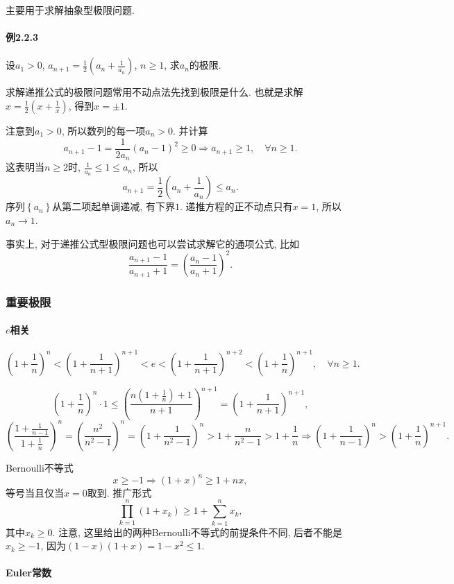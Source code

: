 主要用于求解抽象型极限问题.

\paragraph{例2.2.3}

设$a_{1}>0$, $a_{n+1}=\frac{1}{2}\left(a_{n}+\frac{1}{a_{n}}\right)$,
$n\ge1$, 求$a_{n}$的极限.

求解递推公式的极限问题常用不动点法先找到极限是什么. 也就是求解$x=\frac{1}{2}\left(x+\frac{1}{x}\right)$,
得到$x=\pm1$.

注意到$a_{1}>0$, 所以数列的每一项$a_{n}>0$. 并计算
$$
a_{n+1}-1=\frac{1}{2a_{n}}(a_{n}-1)^{2}\ge0\Longrightarrow a_{n+1}\ge1,\quad\forall n\ge1.
$$
这表明当$n\ge2$时, $\frac{1}{a_{n}}\le1\le a_{n}$, 所以
$$
a_{n+1}=\frac{1}{2}\left(a_{n}+\frac{1}{a_{n}}\right)\le a_{n}.
$$
序列$\left\{ a_{n}\right\} $从第二项起单调递减, 有下界$1$. 递推方程的正不动点只有$x=1$,
所以$a_{n}\to1$.

事实上, 对于递推公式型极限问题也可以尝试求解它的通项公式, 比如
$$
\frac{a_{n+1}-1}{a_{n+1}+1}=\left(\frac{a_{n}-1}{a_{n}+1}\right)^{2}.
$$


\subsubsection{重要极限}

\paragraph{$e$相关}

$$
\left(1+\frac{1}{n}\right)^{n}<\left(1+\frac{1}{n+1}\right)^{n+1}<e<\left(1+\frac{1}{n+1}\right)^{n+2}<\left(1+\frac{1}{n}\right)^{n+1},\quad\forall n\ge1.
$$

$$
\left(1+\frac{1}{n}\right)^{n}\cdot1\le\left(\frac{n\left(1+\frac{1}{n}\right)+1}{n+1}\right)^{n+1}=\left(1+\frac{1}{n+1}\right)^{n+1},
$$
$$
\left(\frac{1+\frac{1}{n-1}}{1+\frac{1}{n}}\right)^{n}=\left(\frac{n^{2}}{n^{2}-1}\right)^{n}=\left(1+\frac{1}{n^{2}-1}\right)^{n}>1+\frac{n}{n^{2}-1}>1+\frac{1}{n}\Longrightarrow\left(1+\frac{1}{n-1}\right)^{n}>\left(1+\frac{1}{n}\right)^{n+1}.
$$

Bernoulli不等式
$$
x\ge-1\Longrightarrow(1+x)^{n}\ge1+nx,
$$
等号当且仅当$x=0$取到. 推广形式
$$
\prod_{k=1}^{n}\left(1+x_{k}\right)\ge1+\sum_{k=1}^{n}x_{k},
$$
其中$x_{k}\ge0$. 注意, 这里给出的两种Bernoulli不等式的前提条件不同, 后者不能是$x_{k}\ge-1$,
因为$(1-x)(1+x)=1-x^{2}\le1$.

\paragraph{Euler常数}

